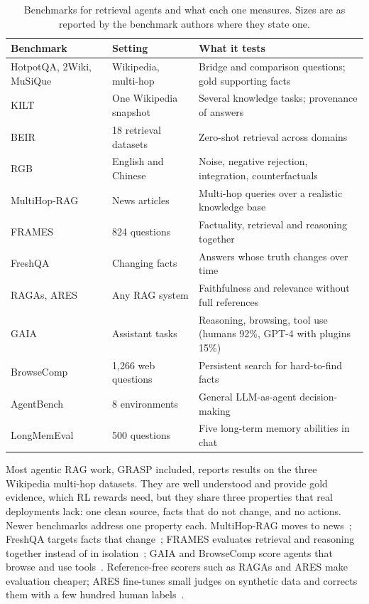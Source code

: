 \documentclass[pdflatex,sn-mathphys-num]{sn-jnl}%
\begin{document}
\begin{table}[t]
\centering
\caption{Benchmarks for retrieval agents and what each one measures. Sizes are as reported by the benchmark authors where they state one.}
\label{tab:bench}
\scriptsize
\setlength{\tabcolsep}{3pt}
\renewcommand{\arraystretch}{1.1}
\begin{tabular}{@{}L{2.9cm}L{2.7cm}L{5.4cm}@{}}
\toprule
\textbf{Benchmark} & \textbf{Setting} & \textbf{What it tests} \\
\midrule
HotpotQA, 2Wiki, MuSiQue~\cite{yang2018hotpotqa,ho2020twowiki,trivedi2022musique} & Wikipedia, multi-hop & Bridge and comparison questions; gold supporting facts \\
KILT~\cite{petroni2021kilt} & One Wikipedia snapshot & Several knowledge tasks; provenance of answers \\
BEIR~\cite{thakur2021beir} & 18 retrieval datasets & Zero-shot retrieval across domains \\
RGB~\cite{chen2024rgb} & English and Chinese & Noise, negative rejection, integration, counterfactuals \\
MultiHop-RAG~\cite{tang2024multihoprag} & News articles & Multi-hop queries over a realistic knowledge base \\
FRAMES~\cite{krishna2025frames} & 824 questions & Factuality, retrieval and reasoning together \\
FreshQA~\cite{vu2024freshllms} & Changing facts & Answers whose truth changes over time \\
RAGAs, ARES~\cite{es2024ragas,saadfalcon2024ares} & Any RAG system & Faithfulness and relevance without full references \\
GAIA~\cite{mialon2024gaia} & Assistant tasks & Reasoning, browsing, tool use (humans 92\%, GPT-4 with plugins 15\%) \\
BrowseComp~\cite{wei2025browsecomp} & 1,266 web questions & Persistent search for hard-to-find facts \\
AgentBench~\cite{liu2024agentbench} & 8 environments & General LLM-as-agent decision-making \\
LongMemEval~\cite{wu2025longmemeval} & 500 questions & Five long-term memory abilities in chat \\
\bottomrule
\end{tabular}
\end{table}

Most agentic RAG work, GRASP included, reports results on the three Wikipedia multi-hop datasets. They are well understood and provide gold evidence, which RL rewards need, but they share three properties that real deployments lack: one clean source, facts that do not change, and no actions. Newer benchmarks address one property each. MultiHop-RAG moves to news~\cite{tang2024multihoprag}; FreshQA targets facts that change~\cite{vu2024freshllms}; FRAMES evaluates retrieval and reasoning together instead of in isolation~\cite{krishna2025frames}; GAIA and BrowseComp score agents that browse and use tools~\cite{mialon2024gaia,wei2025browsecomp}. Reference-free scorers such as RAGAs and ARES make evaluation cheaper; ARES fine-tunes small judges on synthetic data and corrects them with a few hundred human labels~\cite{es2024ragas,saadfalcon2024ares}.
\end{document}
